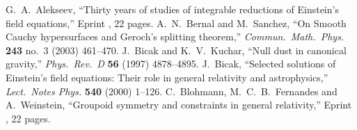 \begin{thebibliography}{99}
  G.~A.~Alekseev,\newblock
  ``Thirty years of studies of integrable reductions of Einstein's field equations,''\newblock
  Eprint , 22 pages.
  A.~N.~Bernal and M.~Sanchez,\newblock
  ``On Smooth Cauchy hypersurfaces and Geroch's splitting theorem,''\newblock
  \emph{Commun.\ Math.\ Phys.} {\bf 243} no.~3 (2003) 461--470\newblock
  [\arXiv{gr-qc/0306108}].
  J.~Bicak and K.~V.~Kuchar,\newblock
  ``Null dust in canonical gravity,''\newblock
  \emph{Phys.\ Rev.\ D} {\bf 56} (1997) 4878--4895\newblock
  [\arXiv{gr-qc/9704053}].
  J.~Bicak,\newblock
  ``Selected solutions of Einstein's field equations: Their role in general relativity and astrophysics,''\newblock
  \emph{Lect.\ Notes Phys.} {\bf 540} (2000) 1--126\newblock
  [\arXiv{gr-qc/0004016}].
  C.~Blohmann, M.~C.~B.~Fernandes and A.~Weinstein,\newblock
  ``Groupoid symmetry and constraints in general relativity,''\newblock
  Eprint , 22 pages.


\end{thebibliography}
